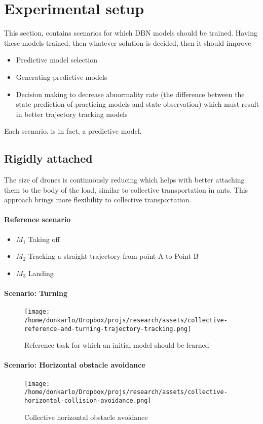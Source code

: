 \documentclass{article}
\begin{document}
	\section{Experimental setup} \label{experimental-setup}
		This section, contains scenarios for which DBN models should be trained. Having these models trained, then whatever solution is decided, then it should improve 
		\begin{itemize}
			\item Predictive model selection
			\item Generating predictive models
			\item Decision making to decrease abnormality rate (the difference between the state prediction of practicing models and state observation) which must result in better trajectory tracking models
		\end{itemize}
		Each scenario, is in fact, a predictive model.
		\subsection{Rigidly attached}
			The size of drones is continuously reducing which helps with better attaching them to the body of the load, similar to collective transportation in ants. This approach brings more flexibility to collective transportation.
			\paragraph{Reference scenario}
			 \begin{itemize}
			 	\item $M_1$ Taking off
			 	\item $M_2$ Tracking a straight trajectory from point A to Point B
			 	\item $M_3$ Landing
			 \end{itemize}
			 
			\paragraph{Scenario: Turning}
			\begin{figure*}
				\centering
				\texttt{[image: /home/donkarlo/Dropbox/projs/research/assets/collective-reference-and-turning-trajectory-tracking.png]}
				\caption{Reference task for which an initial model should be learned}
				\label{fig:collective-reference-and-turning-trajectory-tracking}
			\end{figure*}
			\paragraph{Scenario: Horizontal obstacle avoidance}
				\begin{figure*}
					\centering
					\texttt{[image: /home/donkarlo/Dropbox/projs/research/assets/collective-horizontal-collision-avoidance.png]}
					\caption{Collective horizontal obstacle avoidance}
					\label{fig:swarm-drones-reference-task}
				\end{figure*}
\end{document}
